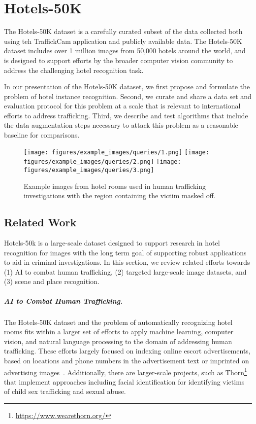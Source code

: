 
\chapter{Hotels-50K}
\label{ch:4}



The Hotels-50K dataset is a carefully curated subset of the data collected both using teh TraffickCam application and publicly available data. The Hotels-50K dataset includes over 1 million images from 50,000 hotels around the world, and is designed to support efforts by the broader computer vision community to address the challenging hotel recognition task.

In our presentation of the Hotels-50K dataset, we first propose and formulate the problem of hotel instance recognition.  Second, we curate and share a data set and evaluation protocol for this problem at a scale that is relevant to international efforts to address trafficking.  Third, we describe and test algorithms that include the data augmentation steps necessary to attack this problem as a reasonable baseline for comparisons.

\begin{figure}
    \centering
    \texttt{[image: figures/example\_images/queries/1.png]}
    \texttt{[image: figures/example\_images/queries/2.png]}
    \texttt{[image: figures/example\_images/queries/3.png]}
    \caption{Example images from hotel rooms used in human trafficking investigations with the region containing the victim masked off.}
    \label{fig:queries}
\end{figure}

\section{Related Work}
Hotels-50k is a large-scale dataset designed to support research in hotel recognition
for images with the long term goal of supporting robust applications to aid in criminal
investigations. In this section, we review related efforts towards (1) AI to combat human trafficking, (2) targeted large-scale image datasets, and (3) scene and place recognition.

\paragraph{AI to Combat Human Trafficking.} The Hotels-50K dataset and the problem of automatically recognizing hotel rooms fits within a larger set of efforts to apply machine learning, computer vision, and natural language processing to the domain of addressing human trafficking.  These efforts largely focused on indexing online escort advertisements, based on locations and phone numbers in the advertisement text or imprinted on advertising images~\cite{alvari2017semi,dubrawski2015leveraging,kejriwal2017investigative,szekely2015building}.  Additionally, there are larger-scale projects, such as Thorn\footnote{\url{https://www.wearethorn.org/}} that implement approaches including facial identification for identifying victims of child sex trafficking and sexual abuse.


